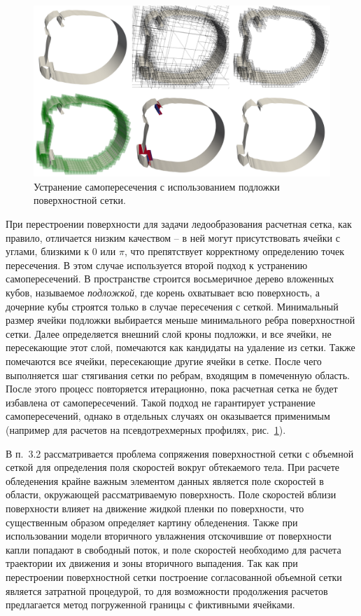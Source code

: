 \documentclass[a4paper,14pt]{extarticle}                     %
\theoremstyle{plain}                                         %
\begin{document}
\begin{figure}[!ht]
\centering
\includegraphics[width=1.0\textwidth]{./pics/text_1_int/wing_all.png}
\singlespacing
\caption{Устранение самопересечения с использованием подложки поверхностной сетки.}
\label{fig:text_1_int_2}
\end{figure}

При перестроении поверхности для задачи ледообразования расчетная сетка, как правило, отличается низким качеством -- в ней могут присутствовать ячейки с углами, близкими к $0$ или $\pi$, что препятствует корректному определению точек пересечения.
В этом случае используется второй подход к устранению самопересечений.
В пространстве строится восьмеричное дерево вложенных кубов, называемое \textit{подложкой}, где корень охватывает всю поверхность, а дочерние кубы строятся только в случае пересечения с сеткой.
Минимальный размер ячейки подложки выбирается меньше минимального ребра поверхностной сетки.
Далее определяется внешний слой кроны подложки, и все ячейки, не пересекающие этот слой, помечаются как кандидаты на удаление из сетки.
Также помечаются все ячейки, пересекающие другие ячейки в сетке.
После чего выполняется шаг стягивания сетки по ребрам, входящим в помеченную область.
После этого процесс повторяется итерационно, пока расчетная сетка не будет избавлена от самопересечений.
Такой подход не гарантирует устранение самопересечений, однако в отдельных случаях он оказывается применимым (например для расчетов на псевдотрехмерных профилях, рис.~\ref{fig:text_1_int_2}).


В п.~3.2 рассматривается проблема сопряжения поверхностной сетки с объемной сеткой для определения поля скоростей вокруг обтекаемого тела.
При расчете обледенения крайне важным элементом данных является поле скоростей в области, окружающей рассматриваемую поверхность.
Поле скоростей вблизи поверхности влияет на движение жидкой пленки по поверхности, что существенным образом определяет картину обледенения.
Также при использовании модели вторичного увлажнения отскочившие от поверхности капли попадают в свободный поток, и поле скоростей необходимо для расчета траектории их движения и зоны вторичного выпадения.
Так как при перестроении поверхностной сетки построение согласованной объемной сетки является затратной процедурой, то для возможности продолжения расчетов предлагается метод погруженной границы с фиктивными ячейками.
\end{document}
